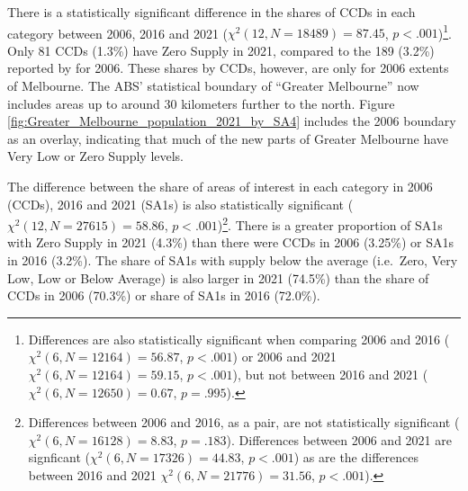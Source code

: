 \documentclass[preprint, 3p,
authoryear]{elsarticle} %
\begin{document}
There is a statistically significant difference in the shares of CCDs in
each category between 2006, 2016 and 2021
(\(\chi^2(12, N = 18489) = 87.45\), \(p < .001\))\footnote{Differences
  are also statistically significant when comparing 2006 and 2016
  (\(\chi^2(6, N = 12164) = 56.87\), \(p < .001\)) or 2006 and 2021
  \(\chi^2(6, N = 12164) = 59.15\), \(p < .001\)), but not between 2016
  and 2021 (\(\chi^2(6, N = 12650) = 0.67\), \(p = .995\)).}. Only 81
CCDs (1.3\%) have Zero Supply in 2021, compared to the 189 (3.2\%)
reported by \citet{currie2010identifying} for 2006. These shares by
CCDs, however, are only for 2006 extents of Melbourne. The ABS'
statistical boundary of ``Greater Melbourne'' now includes areas up to
around 30 kilometers further to the north. Figure
\ref{fig:Greater_Melbourne_population_2021_by_SA4} includes the 2006
boundary as an overlay, indicating that much of the new parts of Greater
Melbourne have Very Low or Zero Supply levels.

The difference between the share of areas of interest in each category
in 2006 (CCDs), 2016 and 2021 (SA1s) is also statistically significant
(\(\chi^2(12, N = 27615) = 58.86\), \(p < .001\))\footnote{Differences
  between 2006 and 2016, as a pair, are not statistically significant
  (\(\chi^2(6, N = 16128) = 8.83\), \(p = .183\)). Differences between
  2006 and 2021 are signficant (\(\chi^2(6, N = 17326) = 44.83\),
  \(p < .001\)) as are the differences between 2016 and 2021
  \(\chi^2(6, N = 21776) = 31.56\), \(p < .001\)).}. There is a greater
proportion of SA1s with Zero Supply in 2021 (4.3\%) than there were CCDs
in 2006 (3.25\%) or SA1s in 2016 (3.2\%). The share of SA1s with supply
below the average (i.e.~Zero, Very Low, Low or Below Average) is also
larger in 2021 (74.5\%) than the share of CCDs in 2006 (70.3\%) or share
of SA1s in 2016 (72.0\%).
\end{document}

